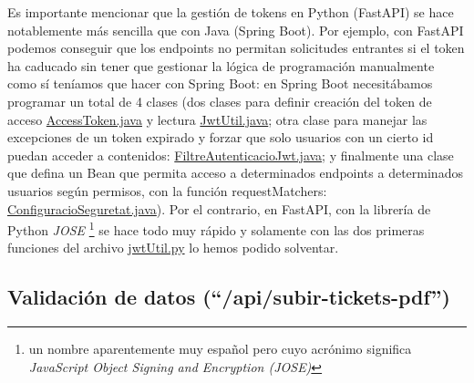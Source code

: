 \documentclass[a4paper,12pt]{report}
\begin{document}
	Es importante mencionar que la gestión de tokens en Python (FastAPI) se hace notablemente más sencilla que con Java (Spring Boot). Por ejemplo, con FastAPI podemos conseguir que los endpoints no permitan solicitudes entrantes si el token ha caducado sin tener que gestionar la lógica de programación manualmente como sí teníamos que hacer con Spring Boot: en Spring Boot necesitábamos programar un total de 4 clases (dos clases para definir creación del token de acceso \href{https://github.com/blackcub3s/mercApp/blob/main/APP%20WEB/__springboot__produccio__/app/src/main/java/miApp/app/seguretat/jwt/AccessToken.java}{AccessToken.java} y lectura \href{https://github.com/blackcub3s/mercApp/blob/main/APP%20WEB/__springboot__produccio__/app/src/main/java/miApp/app/seguretat/jwt/JwtUtil.java}{JwtUtil.java}; otra clase para manejar las excepciones de un token expirado y forzar que solo usuarios con un cierto id puedan acceder a contenidos: \href{https://github.com/blackcub3s/mercApp/blob/main/APP%20WEB/__springboot__produccio__/app/src/main/java/miApp/app/seguretat/FiltreAutenticacioJwt.java}{FiltreAutenticacioJwt.java}; y finalmente una clase que defina un Bean que permita acceso a determinados endpoints a determinados usuarios según permisos, con la función requestMatchers: \href{https://github.com/blackcub3s/mercApp/blob/main/APP%20WEB/__springboot__produccio__/app/src/main/java/miApp/app/seguretat/ConfiguracioSeguretat.java}{ConfiguracioSeguretat.java}). Por el contrario, en FastAPI, con la librería de Python \textit{JOSE} \cite{pythonJose}\footnote{un nombre aparentemente muy español pero cuyo acrónimo significa \textit{JavaScript Object Signing and Encryption (JOSE)}} se hace todo muy rápido y solamente con las dos primeras funciones del archivo \href{https://github.com/blackcub3s/mercApp/blob/main/APP%20WEB/__FastAPI__/app/jwtUtil.py}{jwtUtil.py} lo hemos podido solventar.
	
	\subsection{Validación de datos (``/api/subir-tickets-pdf'')}
	\label{sec:validacioDadesApiSubirtickets}
\end{document}
